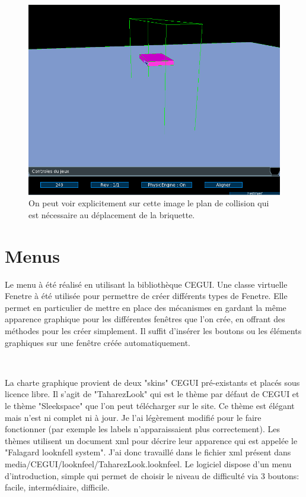 \documentclass[frenchb,twoside]{EPURapport}
\begin{document}
		\newpage
		
		\begin{figure}[h]
			\centering
			\includegraphics[width=16cm]{images/move_briquette.png}
			\caption{\label{fig:move_briquette}On peut voir explicitement sur cette image le plan de collision
			qui est nécessaire au déplacement de la briquette.}
		\end{figure}
		
		
    

    \section{Menus}
        Le menu à été réalisé en utilisant la bibliothèque CEGUI. Une classe
        virtuelle Fenetre à été utilisée pour permettre de créer différents
        types de Fenetre. Elle permet en particulier de mettre en place des
        mécanismes en gardant la même apparence graphique pour les différentes
        fenêtres que l'on crée, en offrant des méthodes pour les créer
        simplement. Il suffit d'insérer les boutons ou les éléments graphiques
        sur une fenêtre créée automatiquement.
        
        \
        
        La charte graphique provient de deux "skins" CEGUI pré-existants et
        placés sous licence libre. Il s'agit de "TaharezLook" qui est le thème
        par défaut de CEGUI et le thème "Sleekspace" que l'on peut télécharger
        sur le site. Ce thème est élégant mais n'est ni complet ni à jour. Je
        l'ai légèrement modifié pour le faire fonctionner (par exemple les
        labels n'apparaissaient plus correctement). Les thèmes utilisent un
        document xml pour décrire leur apparence qui est appelée le "Falagard
        looknfell system". J'ai donc travaillé dans le fichier xml présent
        dans media/CEGUI/looknfeel/TaharezLook.looknfeel.
        Le logiciel dispose d'un menu d'introduction, simple qui permet de
        choisir le niveau de difficulté via 3 boutons: facile, intermédiaire,
        difficile.
\end{document}
